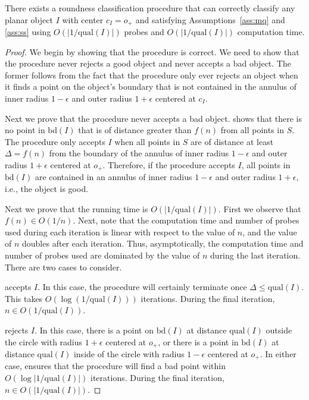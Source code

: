 \documentclass[11pt]{article}
\newcommand{\origin}{o_+}
\newcommand{\bd}{\mathrm{bd}}
\newcommand{\qual}{\mathrm{qual}}
\begin{document}
\begin{thm}
There exists a roundness classification procedure that can correctly
classify any planar object $I$ with center $c_I=\origin$ and satisfying
Assumptions~\ref{ass:mq} and \ref{ass:ss} using $O(|1/\qual(I)|)$
probes and $O(|1/\qual(I)|)$ computation time.
\end{thm}

\begin{proof}
We begin by showing that the procedure is correct.  We need to show
that the procedure never rejects a good object and never accepts a bad
object.  The former follows from the fact that the procedure only ever
rejects an object when it finds a point on the object's boundary that
is not contained in the annulus of inner radius $1-\epsilon$ and outer
radius $1+\epsilon$ centered at $c_I$.

Next we prove that the procedure never accepts a bad object.
 shows that there is no point in $\bd(I)$ that is
of distance greater than $f(n)$ from all points in $S$.  The procedure
only accepts $I$ when all points in $S$ are of distance at least
$\Delta=f(n)$ from the boundary of the annulus of inner radius
$1-\epsilon$ and outer radius $1+\epsilon$ centered at $\origin$. Therefore,
if the procedure accepts $I$, all points in $\bd(I)$ are contained in
an annulus of inner radius $1-\epsilon$ and outer radius $1+\epsilon$,
i.e., the object is good.

Next we prove that the running time is $O(|1/\qual(I)|)$.  First we
observe that $f(n)\in O(1/n)$.  Next, note that the computation time
and number of probes used during each iteration is linear with respect
to the value of $n$, and the value of $n$ doubles after each
iteration.  Thus, asymptotically, the computation time and number of
probes used are dominated by the value of $n$ during the last
iteration.  There are two cases to consider.

  accepts $I$.  In this
case, the procedure will certainly terminate once $\Delta\le\qual(I)$.
This takes $O(\log(1/\qual(I)))$ iterations.  During the final
iteration, $n\in O(1/\qual(I))$.

  rejects $I$.  In this
case, there is a point on $\bd(I)$ at distance $\qual(I)$ outside the
circle with radius $1+\epsilon$ centered at $\origin$, or there is a point
in $\bd(I)$ at distance $\qual(I)$ inside of the circle with radius
$1-\epsilon$ centered at $\origin$.  In either case, 
ensures that the procedure will find a bad point within
$O(\log|1/\qual(I)|)$ iterations.  During the final iteration, $n\in
O(|1/\qual(I)|)$. 
\end{proof}
\end{document}
